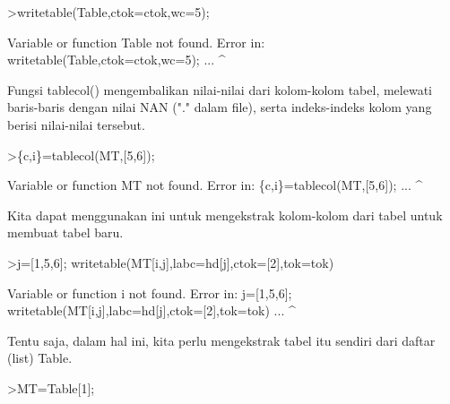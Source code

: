 \documentclass[12pt,arial,letterpaper]{book}
\begin{document}
\begin{eulercomment}
\begin{eulercomment}
\begin{eulercomment}
\begin{eulercomment}
\begin{eulercomment}
\begin{eulercomment}
\begin{eulercomment}
\begin{eulercomment}
\begin{eulercomment}
\begin{eulercomment}
\begin{eulercomment}
\begin{eulercomment}
\begin{eulercomment}
\begin{eulercomment}
\begin{eulercomment}
\begin{eulercomment}
\begin{eulercomment}
\begin{eulercomment}
\begin{eulercomment}
\begin{eulercomment}
\begin{eulercomment}
\begin{eulercomment}
\begin{eulercomment}
\begin{eulercomment}
\begin{eulercomment}
\begin{eulercomment}
\begin{eulercomment}
\begin{eulercomment}
\begin{eulercomment}
\begin{eulercomment}
\begin{eulercomment}
\begin{eulercomment}
\begin{eulerprompt}
>writetable(Table,ctok=ctok,wc=5);
\end{eulerprompt}
\begin{euleroutput}
  Variable or function Table not found.
  Error in:
  writetable(Table,ctok=ctok,wc=5); ...
                  ^
\end{euleroutput}
\begin{eulercomment}
Fungsi tablecol() mengembalikan nilai-nilai dari kolom-kolom tabel,
melewati baris-baris dengan nilai NAN ("." dalam file), serta
indeks-indeks kolom yang berisi nilai-nilai tersebut.
\end{eulercomment}
\begin{eulerprompt}
>\{c,i\}=tablecol(MT,[5,6]);
\end{eulerprompt}
\begin{euleroutput}
  Variable or function MT not found.
  Error in:
  \{c,i\}=tablecol(MT,[5,6]); ...
                   ^
\end{euleroutput}
\begin{eulercomment}
Kita dapat menggunakan ini untuk mengekstrak kolom-kolom dari tabel
untuk membuat tabel baru.
\end{eulercomment}
\begin{eulerprompt}
>j=[1,5,6]; writetable(MT[i,j],labc=hd[j],ctok=[2],tok=tok)
\end{eulerprompt}
\begin{euleroutput}
  Variable or function i not found.
  Error in:
  j=[1,5,6]; writetable(MT[i,j],labc=hd[j],ctok=[2],tok=tok) ...
                            ^
\end{euleroutput}
\begin{eulercomment}
Tentu saja, dalam hal ini, kita perlu mengekstrak tabel itu sendiri
dari daftar (list) Table.
\end{eulercomment}
\begin{eulerprompt}
>MT=Table[1];
\end{eulerprompt}

\end{eulercomment}
\end{eulercomment}
\end{eulercomment}
\end{eulercomment}
\end{eulercomment}
\end{eulercomment}
\end{eulercomment}
\end{eulercomment}
\end{eulercomment}
\end{eulercomment}
\end{eulercomment}
\end{eulercomment}
\end{eulercomment}
\end{eulercomment}
\end{eulercomment}
\end{eulercomment}
\end{eulercomment}
\end{eulercomment}
\end{eulercomment}
\end{eulercomment}
\end{eulercomment}
\end{eulercomment}
\end{eulercomment}
\end{eulercomment}
\end{eulercomment}
\end{eulercomment}
\end{eulercomment}
\end{eulercomment}
\end{eulercomment}
\end{eulercomment}
\end{eulercomment}
\end{eulercomment}
\end{document}
